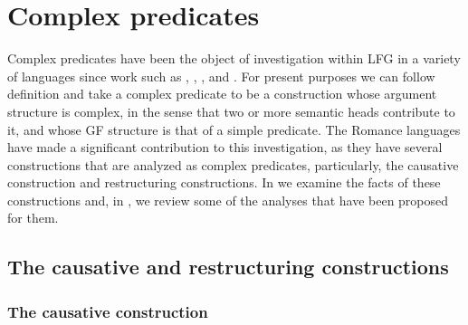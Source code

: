 \documentclass[output=paper,hidelinks]{langscibook}
\begin{document}
\section{Complex predicates}
\label{sec:Romance:4}

Complex predicates have been the object of investigation within LFG in a variety of languages since work such as \citet{Mohanan1990,MohananT1994}, \citet{Matsumoto1992}, \citet{Alsina:PhD,alsina1996the-role}, and \citet{Butt1993,Butt1995}. For present purposes we can follow  definition and take a complex predicate to be a construction whose argument structure is complex, in the sense that two or more semantic heads contribute to it, and whose GF structure is that of a simple predicate. The Romance languages have made a significant contribution to this investigation, as they have several constructions that are analyzed as complex predicates, particularly, the causative construction and restructuring constructions. In  we examine the facts of these constructions and, in , we review some of the analyses that have been proposed for them.

\subsection{The causative and restructuring constructions}
\label{sec:Romance:4.1}

\subsubsection{The causative construction}
\label{sec:Romance:4.1.1}
\end{document}
